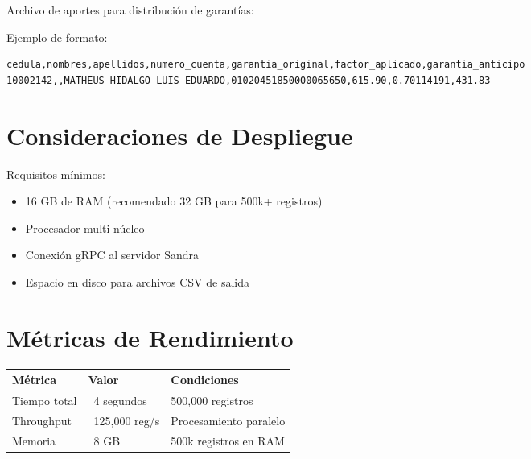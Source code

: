 Archivo de aportes para distribución de garantías:

\bigskip

Ejemplo de formato:

\begin{lstlisting}[breaklines=true,frame=none,basicstyle=\ttfamily\small]
cedula,nombres,apellidos,numero_cuenta,garantia_original,factor_aplicado,garantia_anticipo
10002142,,MATHEUS HIDALGO LUIS EDUARDO,01020451850000065650,615.90,0.70114191,431.83
\end{lstlisting}

\bigskip

\section{Consideraciones de Despliegue}

Requisitos mínimos:

\begin{itemize}
    \item 16 GB de RAM (recomendado 32 GB para 500k+ registros)
    \item Procesador multi-núcleo
    \item Conexión gRPC al servidor Sandra
    \item Espacio en disco para archivos CSV de salida
\end{itemize}

\bigskip

\section{Métricas de Rendimiento}

\begin{center}
\begin{tabular}{lll}
\toprule
\textbf{Métrica} & \textbf{Valor} & \textbf{Condiciones} \\
\midrule
Tiempo total & ~4 segundos & 500,000 registros \\
Throughput & ~125,000 reg/s & Procesamiento paralelo \\
Memoria & ~8 GB & 500k registros en RAM \\
\bottomrule
\end{tabular}
\end{center}

\vfill
\newpage
